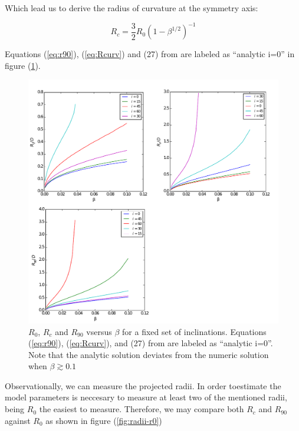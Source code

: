 Which lead us to derive the radius of curvature at the symmetry axis:

\begin{equation}
R_c = \frac{3}{2}R_0\left(1-\beta^{1/2}\right)^{-1}
\label{eq:Rcurv}
\end{equation}

Equations (\ref{eq:r90}),  (\ref{eq:Rcurv}) and (27) from \citep{Canto:1996} are labeled as ``analytic i=0'' in figure (\ref{fig:rad-beta}).

\begin{figure}
\includegraphics[width=\linewidth]{rad-vs-beta}
\caption{$R_0$, $R_c$ and $R_{90}$ vsersus $\beta$ for a fixed set of inclinations. Equations (\ref{eq:r90}), (\ref{eq:Rcurv}), and (27) from \citep{Canto:1996}
are labeled as ``analytic i=0''. Note that the analytic solution deviates from the numeric solution when $\beta \gtrsim 0.1$}
\label{fig:rad-beta}
\end{figure}

Observationally, we can measure the projected radii. In order toestimate the model parameters is neccesary to measure at least two of the mentioned radii, being $R_0$ the
easiest to measure. Therefore, we may compare both $R_c$ and $R_{90}$ against $R_0$ as shown in figure (\ref{fig:radii-r0})

